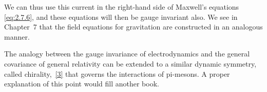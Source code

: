 We can thus use this current in the right-hand side of Maxwell's equations
\eqref{eq:2.7.6}, and these equations will then be gauge invariant also. We
see in Chapter~7 that the field equations for gravitation are constructed in
an analogous manner.

The analogy between the gauge invariance of electrodynamics and the general
covariance of general relativity can be extended to a similar dynamic
symmetry, called chirality,~\hyperref[ch4-ref-3]{[3]} that governs the
interactions of pi-mesons. A proper explanation of this point would fill
another book.
